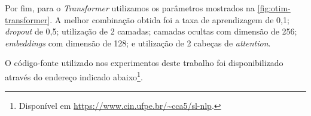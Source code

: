 \begin{figure}[ht!]
{{        }%
    }
    \nomefonte{}
    \label{fig:otim-transformer}
\end{figure}


Por fim, para o \textit{Transformer} utilizamos os parâmetros mostrados na \autoref{fig:otim-transformer}. A melhor combinação obtida foi a taxa de aprendizagem de 0,1; \textit{dropout} de 0,5; utilização de 2 camadas; camadas ocultas com dimensão de 256; \textit{embeddings} com dimensão de 128; e utilização de 2 cabeças de \textit{attention}.


O código-fonte utilizado nos experimentos deste trabalho foi disponibilizado através do endereço indicado abaixo\footnote{
    Disponível em \url{https://www.cin.ufpe.br/~cca5/sl-nlp}.
}.













